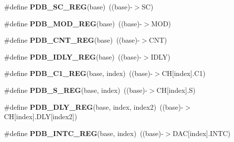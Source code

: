 \begin{DoxyCompactItemize}
\item 
\#define {\bfseries P\+D\+B\+\_\+\+S\+C\+\_\+\+R\+EG}(base)~((base)-\/$>$SC)\hypertarget{group__PDB__Register__Accessor__Macros_gad396df83dcdb6c52e19c05b933ced806}{}\label{group__PDB__Register__Accessor__Macros_gad396df83dcdb6c52e19c05b933ced806}

\item 
\#define {\bfseries P\+D\+B\+\_\+\+M\+O\+D\+\_\+\+R\+EG}(base)~((base)-\/$>$M\+OD)\hypertarget{group__PDB__Register__Accessor__Macros_gab44a66affd75c2b103b25601e02b9fa0}{}\label{group__PDB__Register__Accessor__Macros_gab44a66affd75c2b103b25601e02b9fa0}

\item 
\#define {\bfseries P\+D\+B\+\_\+\+C\+N\+T\+\_\+\+R\+EG}(base)~((base)-\/$>$C\+NT)\hypertarget{group__PDB__Register__Accessor__Macros_ga31689b1e5707390453775501e05c7b16}{}\label{group__PDB__Register__Accessor__Macros_ga31689b1e5707390453775501e05c7b16}

\item 
\#define {\bfseries P\+D\+B\+\_\+\+I\+D\+L\+Y\+\_\+\+R\+EG}(base)~((base)-\/$>$I\+D\+LY)\hypertarget{group__PDB__Register__Accessor__Macros_ga52741bbba3d2a525a775929322a78c75}{}\label{group__PDB__Register__Accessor__Macros_ga52741bbba3d2a525a775929322a78c75}

\item 
\#define {\bfseries P\+D\+B\+\_\+\+C1\+\_\+\+R\+EG}(base,  index)~((base)-\/$>$CH\mbox{[}index\mbox{]}.C1)\hypertarget{group__PDB__Register__Accessor__Macros_ga981d11992d818e9d52a2763041115102}{}\label{group__PDB__Register__Accessor__Macros_ga981d11992d818e9d52a2763041115102}

\item 
\#define {\bfseries P\+D\+B\+\_\+\+S\+\_\+\+R\+EG}(base,  index)~((base)-\/$>$CH\mbox{[}index\mbox{]}.S)\hypertarget{group__PDB__Register__Accessor__Macros_ga1fe8aa6a99bd7bc936a0c1d41a9f217c}{}\label{group__PDB__Register__Accessor__Macros_ga1fe8aa6a99bd7bc936a0c1d41a9f217c}

\item 
\#define {\bfseries P\+D\+B\+\_\+\+D\+L\+Y\+\_\+\+R\+EG}(base,  index,  index2)~((base)-\/$>$CH\mbox{[}index\mbox{]}.D\+LY\mbox{[}index2\mbox{]})\hypertarget{group__PDB__Register__Accessor__Macros_ga27c7be99d84d8016b0af702669b1dfff}{}\label{group__PDB__Register__Accessor__Macros_ga27c7be99d84d8016b0af702669b1dfff}

\item 
\#define {\bfseries P\+D\+B\+\_\+\+I\+N\+T\+C\+\_\+\+R\+EG}(base,  index)~((base)-\/$>$D\+AC\mbox{[}index\mbox{]}.I\+N\+TC)\hypertarget{group__PDB__Register__Accessor__Macros_gad8cf9355314d5d8eda1da8b64f527d8d}{}\label{group__PDB__Register__Accessor__Macros_gad8cf9355314d5d8eda1da8b64f527d8d}


\end{DoxyCompactItemize}
